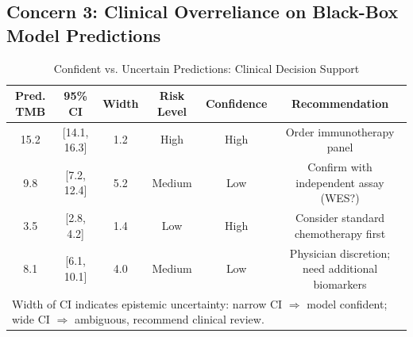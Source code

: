 \documentclass[11pt,a4paper]{article}
\begin{document}
\subsection{Concern 3: Clinical Overreliance on Black-Box Model Predictions}
\label{subsec:overreliance}


\begin{table}[H]
\centering
\caption{Confident vs. Uncertain Predictions: Clinical Decision Support}
\small
\begin{tabular}{|c|c|c|c|c|c|}
\hline
\textbf{Pred. TMB} & \textbf{95\% CI} & \textbf{Width} & \textbf{Risk Level} & \textbf{Confidence} & \textbf{Recommendation} \\
\hline
15.2 & [14.1, 16.3] & 1.2 & High & High & Order immunotherapy panel \\
9.8 & [7.2, 12.4] & 5.2 & Medium & Low & Confirm with independent assay (WES?) \\
3.5 & [2.8, 4.2] & 1.4 & Low & High & Consider standard chemotherapy first \\
8.1 & [6.1, 10.1] & 4.0 & Medium & Low & Physician discretion; need additional biomarkers \\
\hline
\multicolumn{6}{l}{\small Width of CI indicates epistemic uncertainty: narrow CI $\Rightarrow$ model confident; wide CI $\Rightarrow$ ambiguous, recommend clinical review.} \\
\hline
\end{tabular}
\label{tab:confidence_stratification}
\end{table}
\end{document}
